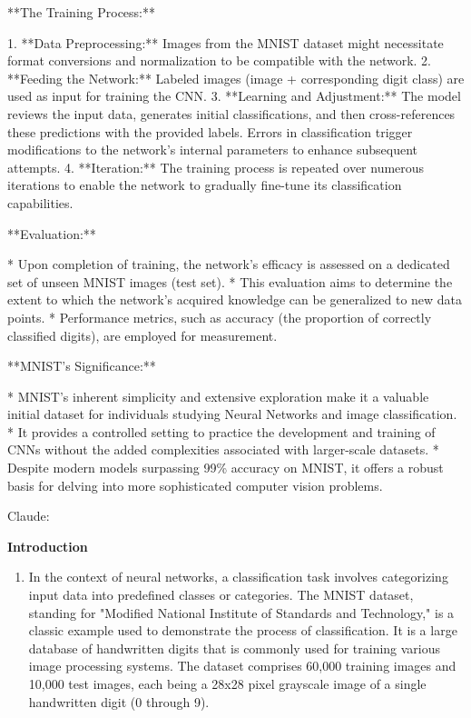 **The Training Process:**

1. **Data Preprocessing:** Images from the MNIST dataset might necessitate format conversions and normalization to be compatible with the network.
2. **Feeding the Network:** Labeled images (image + corresponding digit class) are used as input for training the CNN. 
3. **Learning and Adjustment:** The model reviews the input data, generates initial classifications, and then cross-references these predictions with the provided labels. Errors in classification trigger modifications to the network's internal parameters to enhance subsequent attempts. 
4. **Iteration:** The training process is repeated over numerous iterations to enable the network to gradually fine-tune its classification capabilities.

**Evaluation:**

* Upon completion of training, the network's efficacy is assessed on a dedicated set of unseen MNIST images (test set).
* This evaluation aims to determine the extent to which the network's acquired knowledge can be generalized to new data points.
* Performance metrics, such as accuracy (the proportion of correctly classified digits), are employed for measurement. 

**MNIST's Significance:**

* MNIST's inherent simplicity and extensive exploration make it a valuable initial dataset for individuals studying Neural Networks and image classification.
* It provides a controlled setting to practice the development and training of CNNs without the added complexities associated with larger-scale datasets.
* Despite modern models surpassing 99\% accuracy on MNIST, it offers a robust basis for delving into more sophisticated computer vision problems. 

Claude: 

\textbf{Introduction}

\begin{enumerate}
    \item In the context of neural networks, a classification task involves categorizing input data into predefined classes or categories. The MNIST dataset, standing for "Modified National Institute of Standards and Technology," is a classic example used to demonstrate the process of classification. It is a large database of handwritten digits that is commonly used for training various image processing systems. The dataset comprises 60,000 training images and 10,000 test images, each being a 28x28 pixel grayscale image of a single handwritten digit (0 through 9).
\end{enumerate}

